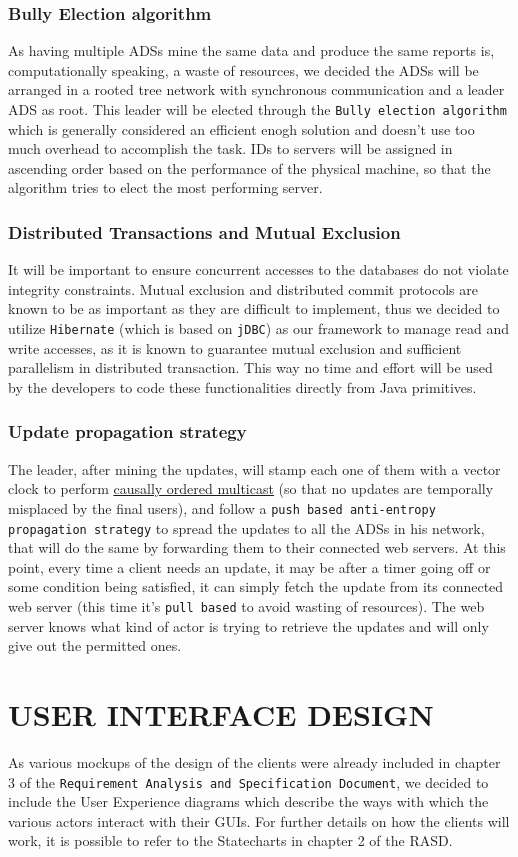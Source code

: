 \documentclass[12pt,a4paper]{article}
\begin{document}
\subsubsection{Bully Election algorithm}
As having multiple ADSs mine the same data and produce the same reports is, computationally speaking, a waste of resources, we decided the ADSs will be arranged in a rooted tree network with synchronous communication and a leader ADS as root. This leader will be elected through the \texttt{Bully election algorithm} which is generally considered an efficient enogh solution and doesn't use too much overhead to accomplish the task. IDs to servers will be assigned in ascending order based on the performance of the physical machine, so that the algorithm tries to elect the most performing server.
\subsubsection{Distributed Transactions and Mutual Exclusion}
It will be important to ensure concurrent accesses to the databases do not violate integrity constraints. Mutual exclusion and distributed commit protocols are known to be as important as they are difficult to implement, thus we decided to utilize \texttt{Hibernate} (which is based on \texttt{jDBC}) as our framework to manage read and write accesses, as it is known to guarantee mutual exclusion and sufficient parallelism in distributed transaction. This way no time and effort will be used by the developers to code these functionalities directly from Java primitives.
\subsubsection{Update propagation strategy}
The leader, after mining the updates, will stamp each one of them with a vector clock to perform \underline{causally ordered multicast} (so that no updates are temporally misplaced by the final users), and follow a \texttt{push based anti-entropy propagation strategy} to spread the updates to all the ADSs in his network, that will do the same by forwarding them to their connected web servers. At this point, every time a client needs an update, it may be after a timer going off or some condition being satisfied, it can simply fetch the update from its connected web server (this time it's \texttt{pull based} to avoid wasting of resources). The web server knows what kind of actor is trying to retrieve the updates and will only give out the permitted ones. 
\newpage
\section{USER INTERFACE DESIGN}
As various mockups of the design of the clients were already included in chapter 3 of the \texttt{Requirement Analysis and Specification Document}, we decided to include the User Experience diagrams which describe the ways with which the various actors interact with their GUIs. For further details on how the clients will work, it is possible to refer to the Statecharts in chapter 2 of the RASD.
\\
\end{document}
